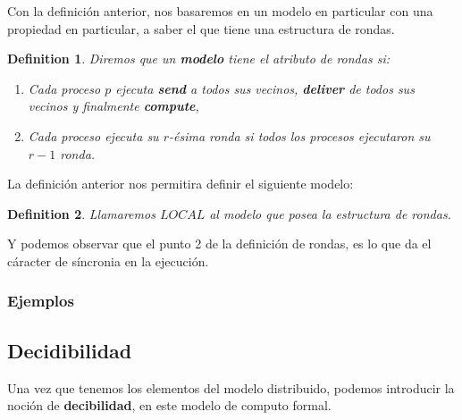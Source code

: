 \documentclass[10pt]{report}
\newtheorem{definition}{Definition}
\begin{document}
    Con la definición anterior, nos basaremos en un modelo en particular con una propiedad en particular, a saber el que
    tiene una estructura de rondas.\newline
    \begin{definition}
        Diremos que un \textbf{modelo} tiene el atributo de rondas si:
        \begin{enumerate}
            \item Cada proceso $p$ ejecuta \textbf{send} a todos sus vecinos, \textbf{deliver} de todos sus vecinos y finalmente \textbf{compute},
            \item Cada proceso ejecuta su $r$-ésima ronda si todos los procesos ejecutaron su $r-1$ ronda.
        \end{enumerate}
    \end{definition}\newline
    La definición anterior nos permitira definir el siguiente modelo:
    \begin{definition}
        Llamaremos $LOCAL$ al modelo que posea la estructura de rondas.
    \end{definition}
    Y podemos observar que el punto 2 de la definición de rondas, es lo que da el cáracter de
    síncronia en la ejecución.
    \subsubsection{Ejemplos}


    \newpage
    \subsection{Decidibilidad}\label{subsec:decidibilidad}
    Una vez que tenemos los elementos del modelo distribuido, podemos introducir la noción de \textbf{decibilidad}, en
    este modelo de computo formal.
\end{document}
